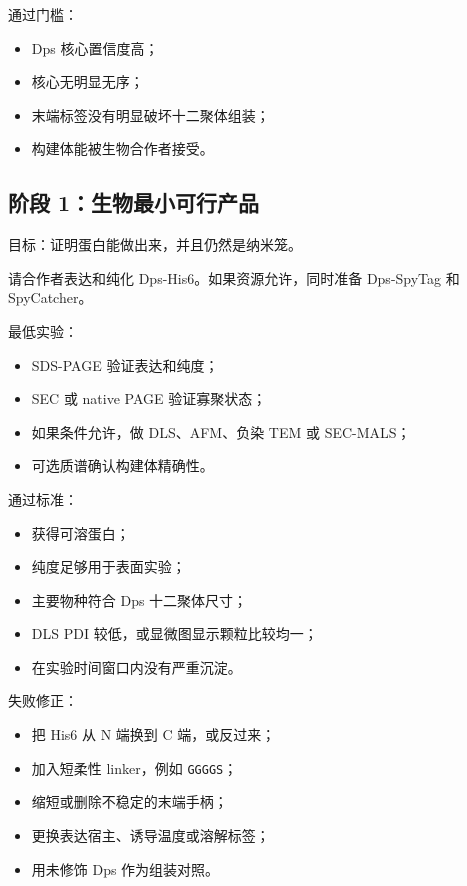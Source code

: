 \documentclass[11pt]{ctexart}
\begin{document}
通过门槛：

\begin{itemize}
\item Dps 核心置信度高；
\item 核心无明显无序；
\item 末端标签没有明显破坏十二聚体组装；
\item 构建体能被生物合作者接受。
\end{itemize}

\subsection{阶段 1：生物最小可行产品}

目标：证明蛋白能做出来，并且仍然是纳米笼。

请合作者表达和纯化 Dps-His6。如果资源允许，同时准备 Dps-SpyTag 和 SpyCatcher。

最低实验：

\begin{itemize}
\item SDS-PAGE 验证表达和纯度；
\item SEC 或 native PAGE 验证寡聚状态；
\item 如果条件允许，做 DLS、AFM、负染 TEM 或 SEC-MALS；
\item 可选质谱确认构建体精确性。
\end{itemize}

通过标准：

\begin{itemize}
\item 获得可溶蛋白；
\item 纯度足够用于表面实验；
\item 主要物种符合 Dps 十二聚体尺寸；
\item DLS PDI 较低，或显微图显示颗粒比较均一；
\item 在实验时间窗口内没有严重沉淀。
\end{itemize}

失败修正：

\begin{itemize}
\item 把 His6 从 N 端换到 C 端，或反过来；
\item 加入短柔性 linker，例如 \texttt{GGGGS}；
\item 缩短或删除不稳定的末端手柄；
\item 更换表达宿主、诱导温度或溶解标签；
\item 用未修饰 Dps 作为组装对照。
\end{itemize}
\end{document}
